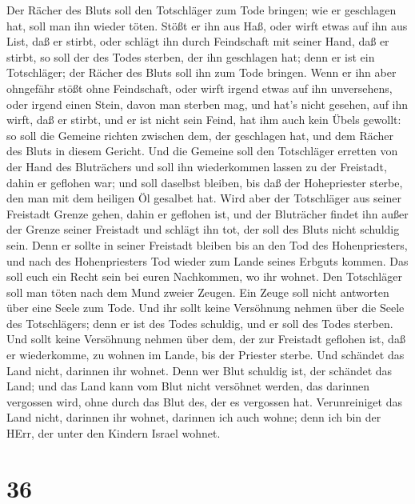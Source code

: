  Der Rächer des Bluts soll den Totschläger zum Tode
bringen; wie er geschlagen hat, soll man ihn wieder töten. 
Stößt er ihn aus Haß, oder wirft etwas auf ihn aus List, daß er stirbt,
 oder schlägt ihn durch Feindschaft mit seiner Hand, daß er
stirbt, so soll der des Todes sterben, der ihn geschlagen hat; denn er
ist ein Totschläger; der Rächer des Bluts soll ihn zum Tode bringen.
 Wenn er ihn aber ohngefähr stößt ohne Feindschaft, oder
wirft irgend etwas auf ihn unversehens,  oder irgend einen
Stein, davon man sterben mag, und hat's nicht gesehen, auf ihn wirft,
daß er stirbt, und er ist nicht sein Feind, hat ihm auch kein Übels
gewollt:  so soll die Gemeine richten zwischen dem, der
geschlagen hat, und dem Rächer des Bluts in diesem Gericht.
 Und die Gemeine soll den Totschläger erretten von der Hand
des Bluträchers und soll ihn wiederkommen lassen zu der Freistadt, dahin
er geflohen war; und soll daselbst bleiben, bis daß der Hohepriester
sterbe, den man mit dem heiligen Öl gesalbet hat.  Wird
aber der Totschläger aus seiner Freistadt Grenze gehen, dahin er
geflohen ist,  und der Bluträcher findet ihn außer der
Grenze seiner Freistadt und schlägt ihn tot, der soll des Bluts nicht
schuldig sein.  Denn er sollte in seiner Freistadt bleiben
bis an den Tod des Hohenpriesters, und nach des Hohenpriesters Tod
wieder zum Lande seines Erbguts kommen.  Das soll euch ein
Recht sein bei euren Nachkommen, wo ihr wohnet.  Den
Totschläger soll man töten nach dem Mund zweier Zeugen. Ein Zeuge soll
nicht antworten über eine Seele zum Tode.  Und ihr sollt
keine Versöhnung nehmen über die Seele des Totschlägers; denn er ist des
Todes schuldig, und er soll des Todes sterben.  Und sollt
keine Versöhnung nehmen über dem, der zur Freistadt geflohen ist, daß er
wiederkomme, zu wohnen im Lande, bis der Priester sterbe. 
Und schändet das Land nicht, darinnen ihr wohnet. Denn wer Blut schuldig
ist, der schändet das Land; und das Land kann vom Blut nicht versöhnet
werden, das darinnen vergossen wird, ohne durch das Blut des, der es
vergossen hat.  Verunreiniget das Land nicht, darinnen ihr
wohnet, darinnen ich auch wohne; denn ich bin der HErr, der unter den
Kindern Israel wohnet.

\hypertarget{section-35}{%
\section{36}\label{section-35}}

